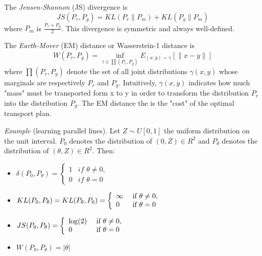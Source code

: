 \documentclass[english]{article}
\begin{document}
\item {The \emph{Jensen-Shannon} (JS) divergence} is
$$ JS(P_r,P_g)=KL(P_r \|P_m)+ KL(P_g \|P_m)$$
where $P_m$ is $\frac{P_r+P_g}{2}$. This divergence is symmetric and always well-defined.






\item {The \emph{Earth-Mover} (EM) distance or Wasserstein-1 distance} is
$$W(P_r,P_g)=\inf_{\gamma \in \prod(P_r,P_g)} E_{(x,y)\sim \gamma} [\|x-y\|]$$
where $\prod(P_r,P_g)$ denote the set of all joint distributions $\gamma(x,y)$ whose marginals are respectively $P_r$ and $P_g$. Intuitively, $\gamma(x,y)$ indicates how much "mass" must be transported form x to y in order to transform the distribution $P_r$ into the distribution $P_g$. The EM distance the is the "cost" of the optimal transport plan.





\item { \emph{Example} (learning parallel lines)}.
Let $Z\sim U[0,1]$ the uniform distribution on the unit interval. $P_0$ denotes the distribution of $(0,Z)\in R^2$ and $P_\theta$ denotes the distribution of $(\theta,Z)\in R^2$. Then:
\begin{itemize}
     \item $\delta(P_0,P_\theta)=\left\{ \begin{array}{ll}
             1 & if \,\, \theta \not= 0,\\
             0 & if \,\, \theta =0 \end{array}\right.$
     
   \end{itemize}






\item {}
\begin{itemize}
     \item $KL(P_0,P_\theta)=KL(P_\theta, P_0)=\left\{ \begin{array}{ll}
             \infty & \textnormal{ if } \theta \not= 0,\\
             0 & \textnormal{ if } \theta =0 \end{array}\right.$
    \item $ JS(P_0,P_\theta)=\left\{ \begin{array}{ll}
             \log(2) & \textnormal{ if } \theta \not= 0,\\
             0 & \textnormal{ if } \theta =0 \end{array}\right.$
   \item $ W(P_0,P_\theta)= |\theta|$
\end{itemize}
\end{document}

